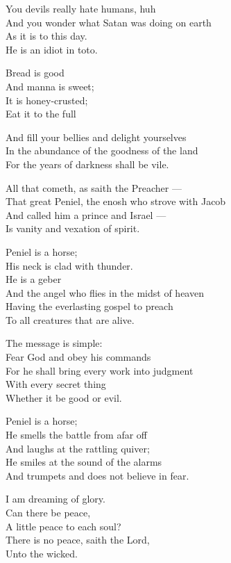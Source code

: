 \documentclass[
]{book}
\begin{document}
You devils really hate humans, huh\\
And you wonder what Satan was doing on earth\\
As it is to this day.\\
He is an idiot in toto.

Bread is good\\
And manna is sweet;\\
It is honey-crusted;\\
Eat it to the full

And fill your bellies and delight yourselves\\
In the abundance of the goodness of the land\\
For the years of darkness shall be vile.

All that cometh, as saith the Preacher ---\\
That great Peniel, the enosh who strove with Jacob\\
And called him a prince and Israel ---\\
Is vanity and vexation of spirit.

Peniel is a horse;\\
His neck is clad with thunder.\\
He is a geber\\
And the angel who flies in the midst of heaven\\
Having the everlasting gospel to preach\\
To all creatures that are alive.

The message is simple:\\
Fear God and obey his commands\\
For he shall bring every work into judgment\\
With every secret thing\\
Whether it be good or evil.

Peniel is a horse;\\
He smells the battle from afar off\\
And laughs at the rattling quiver;\\
He smiles at the sound of the alarms\\
And trumpets and does not believe in fear.

I am dreaming of glory.\\
Can there be peace,\\
A little peace to each soul?\\
There is no peace, saith the Lord,\\
Unto the wicked.
\end{document}
